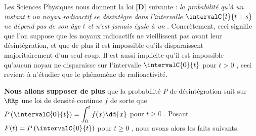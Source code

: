 Les Sciences Physiques nous donnent la loi \textbf{[D]} suivante : \emph{\og la probabilité qu'à un instant $t$ un noyau radioactif se désintègre dans l'intervalle $\intervalC{t}{t + s}$ ne dépend pas de son âge $t$ et n'est jamais égale à un \fg}.
Concrètement, ceci signifie que l'on suppose que les noyaux radioactifs ne vieillissent pas avant leur désintégration, et que de plus il est impossible qu'ils disparaissent majoritairement d'un seul coup. Il est aussi implicite qu'il est impossible qu'aucun noyau ne disparaisse sur l'intervalle $\intervalC{0}{t}$ pour $t > 0$ , ceci revient à n'étudier que le phénomène de radioactivité.


\medskip


\textbf{Nous allons supposer de plus} que la probabilité $P$ de désintégration suit sur $\RRp$ une loi de densité continue $f$ de sorte que $\displaystyle P\left( \intervalC{0}{t} \right) = \int_0^t f(x) \dd{x}$ pour $t \geq 0$ . Posant $F(t) = P\left( \intervalC{0}{t} \right)$ pour $t \geq 0$ , nous avons alors les faits suivants.

